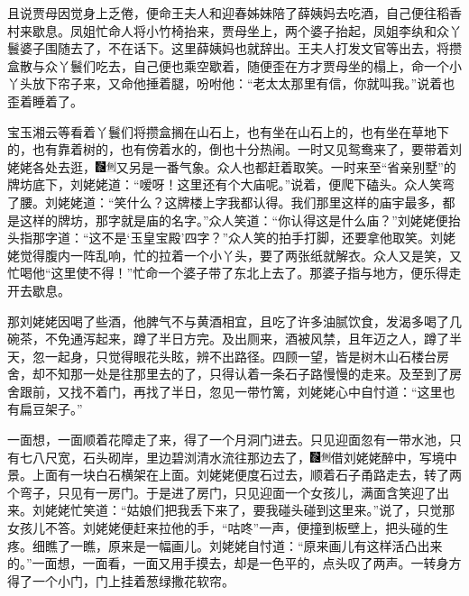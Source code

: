 且说贾母因觉身上乏倦，便命王夫人和迎春姊妹陪了薛姨妈去吃酒，自己便往稻香村来歇息。凤姐忙命人将小竹椅抬来，贾母坐上，两个婆子抬起，凤姐李纨和众丫鬟婆子围随去了，不在话下。这里薛姨妈也就辞出。王夫人打发文官等出去，将攒盒散与众丫鬟们吃去，自己便也乘空歇着，随便歪在方才贾母坐的榻上，命一个小丫头放下帘子来，又命他捶着腿，吩咐他：“老太太那里有信，你就叫我。”说着也歪着睡着了。

宝玉湘云等看着丫鬟们将攒盒搁在山石上，也有坐在山石上的，也有坐在草地下的，也有靠着树的，也有傍着水的，倒也十分热闹。一时又见鸳鸯来了，要带着刘姥姥各处去逛，{\includegraphics[width=3mm]{../Images/00006}\includegraphics[width=3mm]{../Images/00011}\footnotesize \kaishu 又另是一番气象。}众人也都赶着取笑。一时来至“省亲别墅”的牌坊底下，刘姥姥道：“嗳呀！这里还有个大庙呢。”说着，便爬下磕头。众人笑弯了腰。刘姥姥道：“笑什么？这牌楼上字我都认得。我们那里这样的庙宇最多，都是这样的牌坊，那字就是庙的名字。”众人笑道：“你认得这是什么庙？”刘姥姥便抬头指那字道：“这不是‘玉皇宝殿’四字？”众人笑的拍手打脚，还要拿他取笑。刘姥姥觉得腹内一阵乱响，忙的拉着一个小丫头，要了两张纸就解衣。众人又是笑，又忙喝他“这里使不得！”忙命一个婆子带了东北上去了。那婆子指与地方，便乐得走开去歇息。

那刘姥姥因喝了些酒，他脾气不与黄酒相宜，且吃了许多油腻饮食，发渴多喝了几碗茶，不免通泻起来，蹲了半日方完。及出厕来，酒被风禁，且年迈之人，蹲了半天，忽一起身，只觉得眼花头眩，辨不出路径。四顾一望，皆是树木山石楼台房舍，却不知那一处是往那里去的了，只得认着一条石子路慢慢的走来。及至到了房舍跟前，又找不着门，再找了半日，忽见一带竹篱，刘姥姥心中自忖道：“这里也有扁豆架子。”

一面想，一面顺着花障走了来，得了一个月洞门进去。只见迎面忽有一带水池，只有七八尺宽，石头砌岸，里边碧浏清水流往那边去了，{\includegraphics[width=3mm]{../Images/00006}\includegraphics[width=3mm]{../Images/00011}\footnotesize \kaishu 借刘姥姥醉中，写境中景。}上面有一块白石横架在上面。刘姥姥便度石过去，顺着石子甬路走去，转了两个弯子，只见有一房门。于是进了房门，只见迎面一个女孩儿，满面含笑迎了出来。刘姥姥忙笑道：“姑娘们把我丢下来了，要我碰头碰到这里来。”说了，只觉那女孩儿不答。刘姥姥便赶来拉他的手，“咕咚”一声，便撞到板壁上，把头碰的生疼。细瞧了一瞧，原来是一幅画儿。刘姥姥自忖道：“原来画儿有这样活凸出来的。”一面想，一面看，一面又用手摸去，却是一色平的，点头叹了两声。一转身方得了一个小门，门上挂着葱绿撒花软帘。

